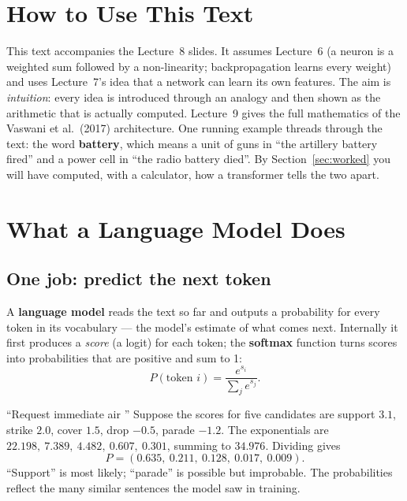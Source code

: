 \documentclass[11pt]{article}
\begin{document}
\tableofcontents
\newpage

\section{How to Use This Text}
This text accompanies the Lecture~8 slides. It assumes Lecture~6 (a neuron is a weighted sum followed by a non-linearity; backpropagation learns every weight) and uses Lecture~7's idea that a network can learn its own features. The aim is \emph{intuition}: every idea is introduced through an analogy and then shown as the arithmetic that is actually computed. Lecture~9 gives the full mathematics of the Vaswani et al.\ (2017) architecture. One running example threads through the text: the word \textbf{battery}, which means a unit of guns in ``the artillery battery fired'' and a power cell in ``the radio battery died''. By Section~\ref{sec:worked} you will have computed, with a calculator, how a transformer tells the two apart.

\section{What a Language Model Does}\label{sec:lm}
\subsection{One job: predict the next token}
A \textbf{language model} reads the text so far and outputs a probability for every token in its vocabulary --- the model's estimate of what comes next. Internally it first produces a \emph{score} (a logit) for each token; the \textbf{softmax} function turns scores into probabilities that are positive and sum to 1:
\[P(\text{token } i)=\frac{e^{s_i}}{\sum_j e^{s_j}}.\]
\begin{example}{``Request immediate air \underline{\hspace{0.8cm}}''}
Suppose the scores for five candidates are support $3.1$, strike $2.0$, cover $1.5$, drop $-0.5$, parade $-1.2$. The exponentials are $22.198,\ 7.389,\ 4.482,\ 0.607,\ 0.301$, summing to $34.976$. Dividing gives
\[P=(0.635,\ 0.211,\ 0.128,\ 0.017,\ 0.009).\]
``Support'' is most likely; ``parade'' is possible but improbable. The probabilities reflect the many similar sentences the model saw in training.
\end{example}
\end{document}
